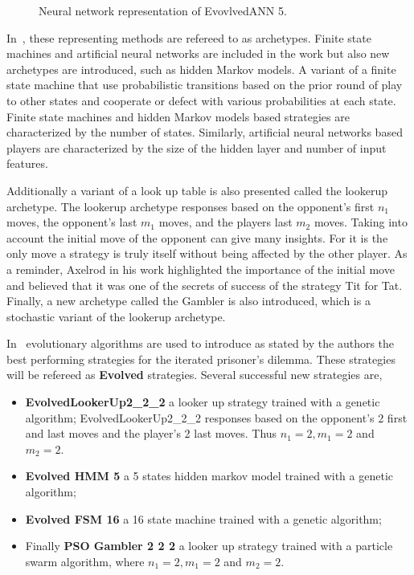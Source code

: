 \documentclass{article}
\theoremstyle{definition}
\begin{document}
\begin{figure}[!hbtp]
    \centering
    
    \caption{Neural network representation of EvovlvedANN 5.}
    \label{fig:ann_5_neural}
\end{figure}

In~\cite{Knight2017}, these representing methods are refereed to as archetypes.
Finite state machines and artificial neural networks are included in the
work but also new archetypes are introduced, such as hidden Markov models. A variant
of a finite state machine that use probabilistic transitions based on the prior
round of play to other states and cooperate or defect with various probabilities
at each state. Finite state machines and hidden Markov models
based strategies are characterized
by the number of states. Similarly, artificial neural networks based players
are characterized by the size of the hidden layer and number of input features.

Additionally a variant of a look up table is also presented called the lookerup
archetype. The lookerup archetype responses based on the opponent's first \(n_1\)
moves, the opponent's last \(m_1\) moves, and the players last \(m_2\) moves.
Taking into account the initial move of the opponent can give many insights.
For it is the only move a strategy is truly itself without being affected by
the other player. As a reminder, Axelrod in his work
highlighted the importance of the initial move and believed that it was one
of the secrets of success of the strategy Tit for Tat. Finally, a new archetype
called the Gambler is also introduced, which is a
stochastic variant of the lookerup archetype.

In~\cite{Knight2017} evolutionary algorithms are used to introduce as stated
by the authors the best performing strategies for the iterated prisoner's dilemma.
These strategies will be refereed  as \textbf{Evolved} strategies.
Several successful new strategies are,

\begin{itemize}
    \item \textbf{EvolvedLookerUp2\_2\_2} a looker up strategy trained with a
    genetic algorithm; EvolvedLookerUp2\_2\_2 responses based on the opponent's
    2 first and last moves and the player's 2 last moves. Thus \(n_1=2, m_1=2\)
    and \(m_2=2\).
    \item \textbf{Evolved HMM 5} a 5 states hidden markov model trained with a genetic
    algorithm;
    \item \textbf{Evolved FSM 16} a 16 state machine trained with a genetic
    algorithm;
    \item Finally \textbf{PSO Gambler 2 2 2} a looker up strategy trained with
    a particle swarm algorithm, where \(n_1=2, m_1=2\) and \(m_2=2\).
\end{itemize}
\end{document}
